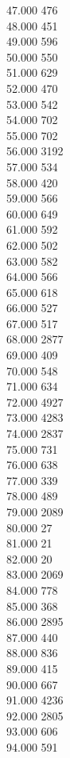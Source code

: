 { 47.000	476 \\
 48.000	451 \\
 49.000	596 \\
 50.000	550 \\
 51.000	629 \\
 52.000	470 \\
 53.000	542 \\
 54.000	702 \\
 55.000	702 \\
 56.000	3192 \\
 57.000	534 \\
 58.000	420 \\
 59.000	566 \\
 60.000	649 \\
 61.000	592 \\
 62.000	502 \\
 63.000	582 \\
 64.000	566 \\
 65.000	618 \\
 66.000	527 \\
 67.000	517 \\
 68.000	2877 \\
 69.000	409 \\
 70.000	548 \\
 71.000	634 \\
 72.000	4927 \\
 73.000	4283 \\
 74.000	2837 \\
 75.000	731 \\
 76.000	638 \\
 77.000	339 \\
 78.000	489 \\
 79.000	2089 \\
 80.000	27 \\
 81.000	21 \\
 82.000	20 \\
 83.000	2069 \\
 84.000	778 \\
 85.000	368 \\
 86.000	2895 \\
 87.000	440 \\
 88.000	836 \\
 89.000	415 \\
 90.000	667 \\
 91.000	4236 \\
 92.000	2805 \\
 93.000	606 \\
 94.000	591 \\
}

